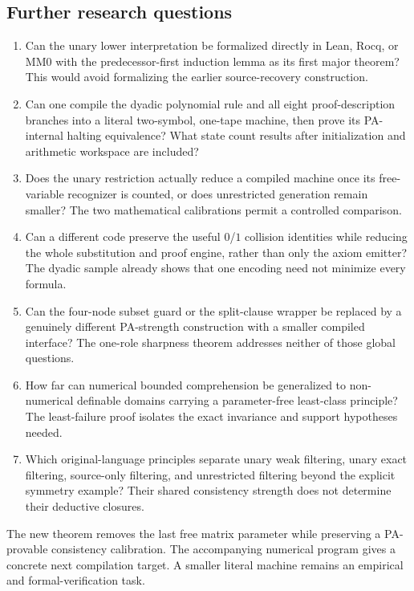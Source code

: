 \subsection{Further research questions}

\begin{enumerate}
\item Can the unary lower interpretation be formalized directly in Lean, Rocq, or MM0 with the predecessor-first induction lemma as its first major theorem? This would avoid formalizing the earlier source-recovery construction.
\item Can one compile the dyadic polynomial rule and all eight proof-description branches into a literal two-symbol, one-tape machine, then prove its PA-internal halting equivalence? What state count results after initialization and arithmetic workspace are included?
\item Does the unary restriction actually reduce a compiled machine once its free-variable recognizer is counted, or does unrestricted generation remain smaller? The two mathematical calibrations permit a controlled comparison.
\item Can a different code preserve the useful $0$/$1$ collision identities while reducing the whole substitution and proof engine, rather than only the axiom emitter? The dyadic sample already shows that one encoding need not minimize every formula.
\item Can the four-node subset guard or the split-clause wrapper be replaced by a genuinely different PA-strength construction with a smaller compiled interface? The one-role sharpness theorem addresses neither of those global questions.
\item How far can numerical bounded comprehension be generalized to non-numerical definable domains carrying a parameter-free least-class principle? The least-failure proof isolates the exact invariance and support hypotheses needed.
\item Which original-language principles separate unary weak filtering, unary exact filtering, source-only filtering, and unrestricted filtering beyond the explicit symmetry example? Their shared consistency strength does not determine their deductive closures.
\end{enumerate}

The new theorem removes the last free matrix parameter while preserving a PA-provable consistency calibration. The accompanying numerical program gives a concrete next compilation target. A smaller literal machine remains an empirical and formal-verification task.
